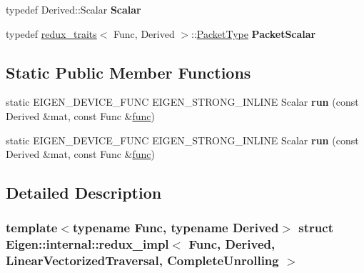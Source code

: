 \begin{DoxyCompactItemize}
typedef Derived\+::\+Scalar {\bfseries Scalar}
\item 
\mbox{\label{struct_eigen_1_1internal_1_1redux__impl_3_01_func_00_01_derived_00_01_linear_vectorized_traversal_00_01_complete_unrolling_01_4_a45c80e6975a1cc49f74f7dc5e11ff837}} 
typedef \hyperlink{struct_eigen_1_1internal_1_1redux__traits}{redux\+\_\+traits}$<$ Func, Derived $>$\+::\hyperlink{struct_eigen_1_1_packet_type}{Packet\+Type} {\bfseries Packet\+Scalar}
\end{DoxyCompactItemize}
\subsection*{Static Public Member Functions}
\begin{DoxyCompactItemize}
\item 
\mbox{\label{struct_eigen_1_1internal_1_1redux__impl_3_01_func_00_01_derived_00_01_linear_vectorized_traversal_00_01_complete_unrolling_01_4_a6754e76fe3d22a79a501da7f826f67c9}} 
static E\+I\+G\+E\+N\+\_\+\+D\+E\+V\+I\+C\+E\+\_\+\+F\+U\+NC E\+I\+G\+E\+N\+\_\+\+S\+T\+R\+O\+N\+G\+\_\+\+I\+N\+L\+I\+NE Scalar {\bfseries run} (const Derived \&mat, const Func \&\hyperlink{structfunc}{func})
\item 
\mbox{\label{struct_eigen_1_1internal_1_1redux__impl_3_01_func_00_01_derived_00_01_linear_vectorized_traversal_00_01_complete_unrolling_01_4_a6754e76fe3d22a79a501da7f826f67c9}} 
static E\+I\+G\+E\+N\+\_\+\+D\+E\+V\+I\+C\+E\+\_\+\+F\+U\+NC E\+I\+G\+E\+N\+\_\+\+S\+T\+R\+O\+N\+G\+\_\+\+I\+N\+L\+I\+NE Scalar {\bfseries run} (const Derived \&mat, const Func \&\hyperlink{structfunc}{func})
\end{DoxyCompactItemize}


\subsection{Detailed Description}
\subsubsection*{template$<$typename Func, typename Derived$>$\newline
struct Eigen\+::internal\+::redux\+\_\+impl$<$ Func, Derived, Linear\+Vectorized\+Traversal, Complete\+Unrolling $>$}



